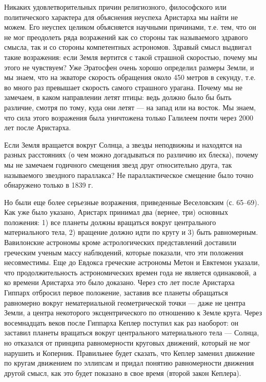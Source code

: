 Никаких  удовлетворительных  причин   религиозного,  философского  или
политического характера для объяснения  неуспеха Аристарха мы найти не
можем.  Его  неуспех  целиком  объясняется  научными  причинами,  т.е.
тем,  что он  не мог  преодолеть ряда  возражений как  со стороны  так
называемого здравого смысла, так и со стороны компетентных астрономов.
Здравый смысл выдвигал  такие возражения: если Земля  вертится с такой
страшной скоростью, почему мы этого  не чувствуем? Уже Эратосфен очень
хорошо определил размеры  Земли, и мы знаем, что  на экваторе скорость
обращения  около 450  метров в  секунду, т.е.  во много  раз превышает
скорость  самого страшного  урагана. Почему  мы не  замечаем, в  каком
направлении летят птицы: ведь должно  было бы быть различие, смотря по
тому, куда они  летят --- на запад  или на восток. Мы  знаем, что сила
этого возражения была уничтожена только  Галилеем почти через 2000 лет
после Аристарха.

Если Земля вращается вокруг Солнца, а звезды неподвижны и находятся на
разных расстояниях (о  чем можно догадываться по  различию их блеска),
почему  мы  не замечаем  годичного  смещения  звезд друг  относительно
друга,  так  называемого  звездного  параллакса?  Не  параллактическое
смещение было точно обнаружено только в 1839 г.

Но  были  еще  более  серьезные  возражения,  приведенные  Веселовским
(с.  65--69). Как  уже было  указано, Аристарх  принимал два  (вернее,
три)  основных  положения:  1)  все планеты  должны  вращаться  вокруг
центрального материального  тела, 2) вращение  должно идти по  кругу и
3)  быть  равномерным.  Вавилонские  астрономы  кроме  астрологических
представлений  доставили греческим  ученым  массу наблюдений,  которые
показали,   что   эти   положения   несовместимы.   Еще   до   Евдокса
греческие астрономы  Метон и  Евктемон указали,  что продолжительность
астрономических  времен  года не  является  одинаковой,  а ко  времени
Аристарха это  было доказано.  Через сто  лет после  Аристарха Гиппарх
отбросил первое положение, заставив  все планеты обращаться равномерно
вокруг нематериальной геометрической точки --- даже не центра Земли, а
центра некоторого  эксцентрического по отношению к  Земле круга. Через
восемнадцать веков после Гиппарха Кеплер поступил как раз наоборот: он
заставил планеты вращаться вокруг  центрального материального тела ---
Солнца,  но отказался  от  принципа  равномерности круговых  движений,
который  не мог  нарушить и  Коперник. Правильнее  будет сказать,  что
Кеплер  заменил движение  по  кругам движением  по  эллипсам и  придал
понятию равномерности движения другой смысл,  как это будет показано в
свое время (второй закон Кеплера).

